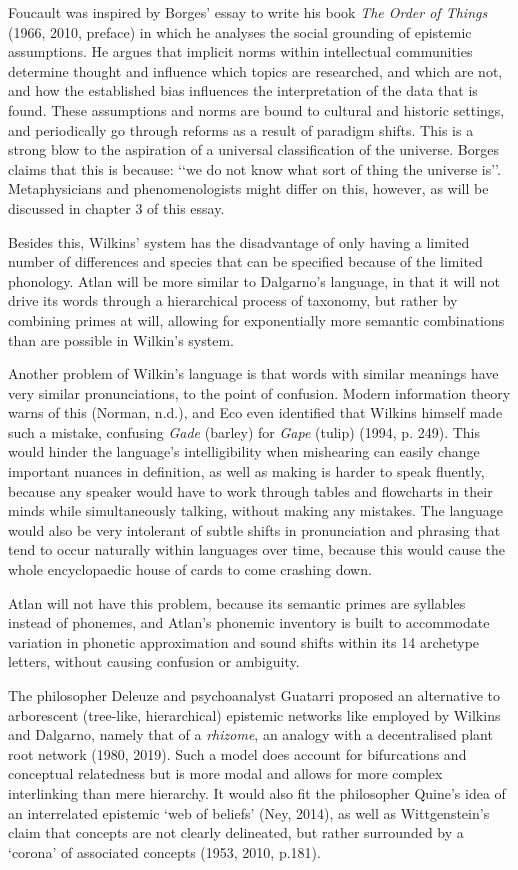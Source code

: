 Foucault was inspired by Borges’ essay to write his book \textit{The Order of Things} (1966, 2010, preface) in which he analyses the social grounding of epistemic assumptions. He argues that implicit norms within intellectual communities determine thought and influence which topics are researched, and which are not, and how the established bias influences the interpretation of the data that is found. These assumptions and norms are bound to cultural and historic settings, and periodically go through reforms as a result of paradigm shifts. This is a strong blow to the aspiration of a universal classification of the universe. Borges claims that this is because: ‘‘we do not know what sort of thing the universe is’’. Metaphysicians and phenomenologists might differ on this, however, as will be discussed in chapter 3 of this essay.  

Besides this, Wilkins’ system has the disadvantage of only having a limited number of differences and species that can be specified because of the limited phonology. Atlan will be more similar to Dalgarno’s language, in that it will not drive its words through a hierarchical process of taxonomy, but rather by combining primes at will, allowing for exponentially more semantic combinations than are possible in Wilkin’s system. 

Another problem of Wilkin’s language is that words with similar meanings have very similar pronunciations, to the point of confusion. Modern information theory warns of this (Norman, n.d.), and Eco even identified that Wilkins himself made such a mistake, confusing {\it Gade} (barley) for {\it Gape} (tulip) (1994, p. 249). This would hinder the language’s intelligibility when mishearing can easily change important nuances in definition, as well as making is harder to speak fluently, because any speaker would have to work through tables and flowcharts in their minds while simultaneously talking, without making any mistakes. The language would also be very intolerant of subtle shifts in pronunciation and phrasing that tend to occur naturally within languages over time, because this would cause the whole encyclopaedic house of cards to come crashing down. 

Atlan will not have this problem, because its semantic primes are syllables instead of phonemes, and Atlan’s phonemic inventory is built to accommodate variation in phonetic approximation and sound shifts within its 14 archetype letters, without causing confusion or ambiguity. 

The philosopher Deleuze and psychoanalyst Guatarri proposed an alternative to arborescent (tree-like, hierarchical) epistemic networks like employed by Wilkins and Dalgarno, namely that of a {\it rhizome}, an analogy with a decentralised plant root network (1980, 2019). Such a model does account for bifurcations and conceptual relatedness but is more modal and allows for more complex interlinking than mere hierarchy. It would also fit the philosopher Quine’s idea of an interrelated epistemic ‘web of beliefs’ (Ney, 2014), as well as Wittgenstein’s claim that concepts are not clearly delineated, but rather surrounded by a ‘corona’ of associated concepts (1953, 2010, p.181). 

